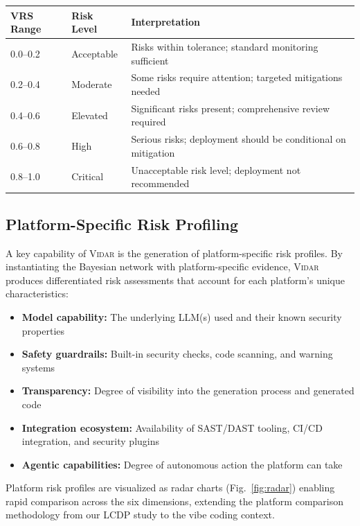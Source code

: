 \documentclass[preprint,review,12pt]{elsarticle}
\newcommand{\vidar}{\textsc{Vidar}}
\begin{document}
\begin{center}
\begin{tabular}{l l l}
\toprule
\textbf{VRS Range} & \textbf{Risk Level} & \textbf{Interpretation} \\
\midrule
0.0--0.2 & Acceptable & Risks within tolerance; standard monitoring sufficient \\
0.2--0.4 & Moderate & Some risks require attention; targeted mitigations needed \\
0.4--0.6 & Elevated & Significant risks present; comprehensive review required \\
0.6--0.8 & High & Serious risks; deployment should be conditional on mitigation \\
0.8--1.0 & Critical & Unacceptable risk level; deployment not recommended \\
\bottomrule
\end{tabular}
\end{center}


\subsection{Platform-Specific Risk Profiling}
\label{subsec:profiling}

A key capability of \vidar{} is the generation of platform-specific risk profiles. By instantiating the Bayesian network with platform-specific evidence, \vidar{} produces differentiated risk assessments that account for each platform's unique characteristics:

\begin{itemize}
    \item \textbf{Model capability:} The underlying LLM(s) used and their known security properties
    \item \textbf{Safety guardrails:} Built-in security checks, code scanning, and warning systems
    \item \textbf{Transparency:} Degree of visibility into the generation process and generated code
    \item \textbf{Integration ecosystem:} Availability of SAST/DAST tooling, CI/CD integration, and security plugins
    \item \textbf{Agentic capabilities:} Degree of autonomous action the platform can take
\end{itemize}

Platform risk profiles are visualized as radar charts (Fig.~\ref{fig:radar}) enabling rapid comparison across the six dimensions, extending the platform comparison methodology from our LCDP study \cite{hathnagoda2024assessing} to the vibe coding context.
\end{document}
